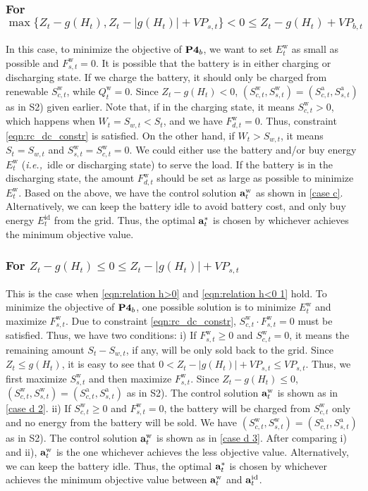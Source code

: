\documentclass[journal]{IEEEtran}
\def\abf{{\bf a}}
\def\ie{{\it i.e.,\ \/}}
\def\w{\textrm{w}}
\begin{document}
\subsubsection{For $\max\{Z_t-g(H_t),Z_t-|g(H_t)|+VP_{s,t}\}<0\leq Z_t-g(H_t)+VP_{b,t}$} In this case, to minimize the objective of  $\text{\bf P4}_b$, we want to set $E^\w_t$ as small as possible and $F^\w_{s,t}=0$. It is possible that the battery is in either charging or discharging state. If we charge the battery, it should only be charged from renewable $S^\w_{c,t}$, while $Q^\w_t=0$. Since $Z_t-g(H_t)< 0$, $(S^\w_{c,t},S^\w_{s,t})=(S^\text{a}_{c,t},S^\text{a}_{s,t})$  as in S2) given earlier. Note that, if in the charging state, it means $S^\w_{c,t}>0$, which happens when  $W_t=S_{w,t}<S_t$, and we have   $F^\w_{d,t}=0$. Thus, constraint \eqref{eqn:rc_dc_constr} is satisfied.  On the other hand, if $W_t>S_{w,t}$, it means $S_t=S_{w,t}$ and $S^\w_{s,t}=S^\w_{c,t}=0$. We could either use the battery and/or buy energy  $E^\w_t$ (\ie idle or discharging state) to serve the load. If the battery is in the discharging state, the amount  $F^\w_{d,t}$ should be set as large as possible to minimize  $E^\w_t$.  Based on the above, we have the control solution $\abf^\w_t$ as shown in \eqref{case c}.
Alternatively, we can keep the battery idle to avoid battery cost, and only buy energy $E_t^\textrm{id}$ from the grid. Thus, the optimal $\abf^*_t$ is chosen by whichever achieves the minimum objective value.

\subsubsection{For $Z_t-g(H_t) \le 0\le Z_t-|g(H_t)|+VP_{s,t}$} This is the case when \eqref{eqn:relation h>0} and \eqref{eqn:relation h<0 1} hold.
To minimize the objective of $\text{\bf P4}_b$, one possible solution is to minimize $E^\w_t$ and maximize $F^\w_{s,t}$. Due to constraint \eqref{eqn:rc_dc_constr}, $S^\w_{c,t}\cdot F^\w_{s,t}=0$ must be satisfied. Thus, we have two conditions: i) If $F^\w_{s,t}\geq0$ and $S^\w_{c,t}=0$, it means the remaining amount $S_t-S_{w,t}$, if any, will be only sold back to the grid. Since $Z_t\le g(H_t)$, it is easy to see that $0<Z_t-|g(H_t)|+VP_{s,t}\le VP_{s,t}$. Thus, we first maximize  $S^\w_{s,t}$ and then maximize $F^\w_{s,t}$. Since $Z_t-g(H_t)\le 0$, $(S^\w_{c,t},S^\w_{s,t})=(S^\text{a}_{c,t},S^\text{a}_{s,t})$  as in S2). The control solution $\abf_t^\w$ is shown as in \eqref{case d 2}.
ii) If $S^\w_{c,t}\geq0$ and $F^\w_{s,t}=0$, the battery will be charged from $S^\w_{c,t}$ only and no energy from the battery will be sold. We have $(S^\w_{c,t},S^\w_{s,t})=(S^\text{a}_{c,t},S^\text{a}_{s,t})$  as in S2). The control solution $\abf^\w_t$ is shown as in \eqref{case d 3}. After comparing i) and ii), $\abf^\w_t$ is the one whichever achieves the less objective value.
Alternatively, we can keep the battery idle. Thus, the optimal $\abf^*_t$ is chosen by whichever achieves the minimum objective value between $\abf^\w_t$ and $\abf_t^\textrm{id}$.
\end{document}
